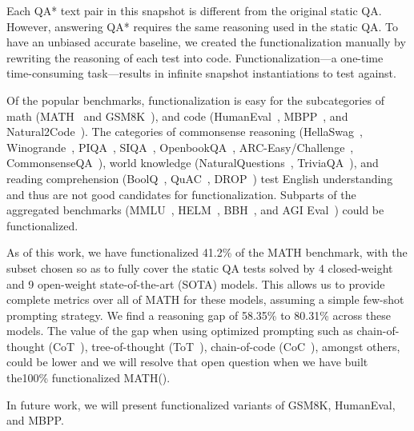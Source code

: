 \documentclass[11pt,a4paper]{article}
\begin{document}
Each QA* text pair in this snapshot is different from the
original static QA. However, answering QA*  requires the same
reasoning used in the static QA. To have an unbiased accurate baseline, we
created the functionalization manually by rewriting the
reasoning of each test into code. Functionalization---a one-time
time-consuming task---results in infinite snapshot instantiations
to test against.


Of the popular benchmarks, functionalization is easy for the subcategories of
math (MATH~\cite{math} and GSM8K~\cite{gsm8k}), and code
(HumanEval~\cite{humaneval}, MBPP~\cite{mbpp}, and Natural2Code~\cite{gemini}).
The categories of commonsense reasoning (HellaSwag~\cite{hellaswag},
Winogrande~\cite{winogrande}, PIQA~\cite{piqa}, SIQA~\cite{siqa},
OpenbookQA~\cite{openbookqa}, ARC-Easy/Challenge~\cite{arc-easy-challenge},
CommonsenseQA~\cite{commonsenseQA}), world knowledge
(NaturalQuestions~\cite{naturalquestions}, TriviaQA~\cite{triviaQA}), and
reading comprehension (BoolQ~\cite{boolq}, QuAC~\cite{quac}, DROP~\cite{drop})
test English understanding and thus are not good candidates for
functionalization.  Subparts of the aggregated benchmarks (MMLU~\cite{mmlu},
HELM~\cite{helm}, BBH~\cite{big-bench-hard}, and AGI Eval~\cite{agi-eval}) could
be functionalized.

As of this work, we have functionalized 41.2\% of the MATH benchmark, with the
subset chosen so as to fully cover the static QA tests solved by 4 closed-weight and 9
open-weight state-of-the-art (SOTA) models. This allows us to provide complete metrics
over all of MATH for these models, assuming a simple few-shot prompting strategy.
We find a reasoning gap of 58.35\% to 80.31\% across these models.
The value of the gap when
using optimized prompting such as chain-of-thought
(CoT~\cite{chain-of-thought}), tree-of-thought (ToT~\cite{tree-of-thought}),
chain-of-code (CoC~\cite{chain-of-code}), amongst others, could be lower and we
will resolve that open question when we have built the100\% functionalized MATH().

In future work, we will present
functionalized variants of GSM8K, HumanEval, and MBPP.
\end{document}

